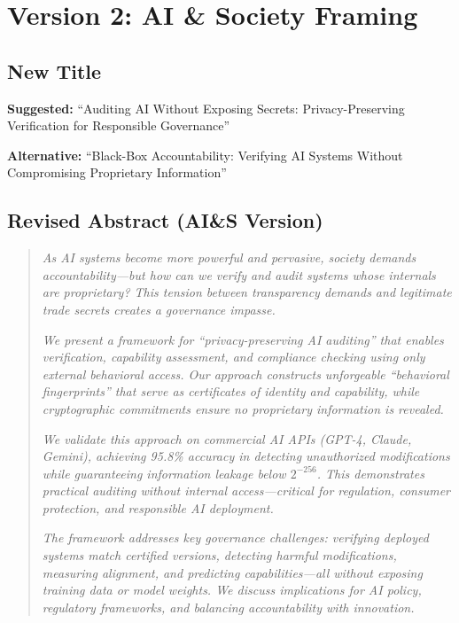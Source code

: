 \documentclass[12pt]{article}
\begin{document}
\section{Version 2: AI \& Society Framing}

\subsection{New Title}

\textbf{Suggested:} ``Auditing AI Without Exposing Secrets: Privacy-Preserving Verification for Responsible Governance''

\textbf{Alternative:} ``Black-Box Accountability: Verifying AI Systems Without Compromising Proprietary Information''

\subsection{Revised Abstract (AI\&S Version)}

\begin{quote}
\textit{As AI systems become more powerful and pervasive, society demands accountability—but how can we verify and audit systems whose internals are proprietary? This tension between transparency demands and legitimate trade secrets creates a governance impasse.}

\textit{We present a framework for ``privacy-preserving AI auditing'' that enables verification, capability assessment, and compliance checking using only external behavioral access. Our approach constructs unforgeable ``behavioral fingerprints'' that serve as certificates of identity and capability, while cryptographic commitments ensure no proprietary information is revealed.}

\textit{We validate this approach on commercial AI APIs (GPT-4, Claude, Gemini), achieving 95.8\% accuracy in detecting unauthorized modifications while guaranteeing information leakage below $2^{-256}$. This demonstrates practical auditing without internal access—critical for regulation, consumer protection, and responsible AI deployment.}

\textit{The framework addresses key governance challenges: verifying deployed systems match certified versions, detecting harmful modifications, measuring alignment, and predicting capabilities—all without exposing training data or model weights. We discuss implications for AI policy, regulatory frameworks, and balancing accountability with innovation.}
\end{quote}
\end{document}
